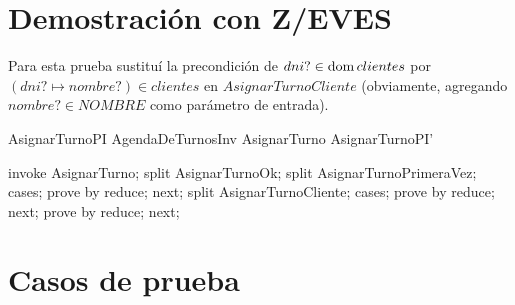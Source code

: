 \documentclass[%
  fleqn,colorlinks,linkcolor=blue,citecolor=blue,urlcolor=blue]{eptcs}
\begin{document}
\section{Demostraci\'on con Z/EVES}
Para esta prueba sustitu\'i{} la precondici\'on de $dni? \in \mathop{\mathrm{dom}} clientes$
por $(dni? \mapsto nombre?) \in clientes$ en $AsignarTurnoCliente$ (obviamente,
agregando $nombre? \in NOMBRE$ como par\'ametro de entrada).


\begin{theorem}{AsignarTurnoPI}
AgendaDeTurnosInv \land AsignarTurno \implies AsignarTurnoPI'
\end{theorem}

\begin{zproof}[AsignarTurnoPI]
invoke AsignarTurno;
split AsignarTurnoOk;
split AsignarTurnoPrimeraVez;
cases;
prove by reduce;
next;
split AsignarTurnoCliente;
cases;
prove by reduce;
next;
prove by reduce;
next;
\end{zproof}

\section{Casos de prueba}
\end{document}
